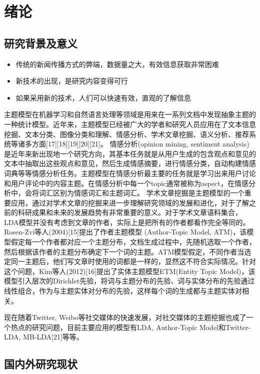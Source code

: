 \chapter{绪论}

\section{研究背景及意义}

\begin{itemize}
\item 传统的新闻传播方式的弊端，数据量之大，有效信息获取非常困难
\item 新技术的出现，是研究内容变得可行
\item 如果采用新的技术，人们可以快速有效，直观的了解信息
\end{itemize}

主题模型在机器学习和自然语言处理等领域是用来在一系列文档中发现抽象主题的一种统计模型。近年来，主题模型已经被广大的学者和研究人员应用在了文本信息挖掘、文本分类、图像分类和理解、情感分析、学术文章挖掘、语义分析、推荐系统等诸多方面[17][18][19][20][21]。
情感分析(opinion mining,  sentiment analysis)是近年来新出现地一个研究方向，其基本任务就是从用户生成的包含观点和意见的文本中抽取出这些观点和意见，然后生成情感摘要，进行情感分类，自动构建情感词典等等情感分析任务。主题模型在情感分析最主要的任务就是学习出来用户讨论和用户评论中的内容主题。在情感分析中每一个topic通常被称为aspect，在情感分析中，会将词汇区别为情感词汇和主题词汇。
学术文章挖掘是主题模型的一个重要应用，通过对学术文章的挖掘来进一步理解研究领域的发展和进化，对于了解之前的科研成果和未来的发展趋势有非常重要的意义。对于学术文章语料集合，LDA模型并没有考虑到文章的作者，实际上是把所有的作者都看作完全等同的。Rosen-Zvi等人(2004)[15]提出了作者主题模型 (Author-Topic Model, ATM)，该模型假定每一个作者都对应一个主题分布，文档生成过程中，先随机选取一个作者，然后根据该作者的主题分布确定下一个词的主题。ATM模型假定，不同作者当选定同一主题后，他们写文章时使用的词都是一样的，显然这不符合实际情况。针对这个问题，Kim等人(2012)[16]提出了实体主题模型ETM(Entity Topic Model)，该模型引入层次的Dirichlet先验，将词与主题分布的先验、词与实体分布的先验通过线性组合，作为与主题实体对分布的先验，这样每个词的生成都与主题实体对相关。


现在随着Twitter, Weibo等社交媒体的快速发展，对社交媒体的主题挖掘也成了一个热点的研究问题，目前主要应用的模型有LDA, Author-Topic Model和Twitter-LDA, MB-LDA[21]等等。

\section{国内外研究现状}

